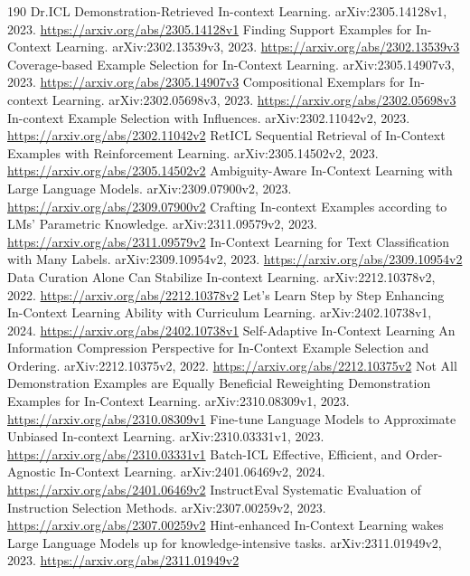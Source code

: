 \documentclass[11pt]{article}
\begin{document}
\begin{thebibliography}{190}
 Dr.ICL Demonstration-Retrieved In-context Learning. arXiv:2305.14128v1, 2023. \url{https://arxiv.org/abs/2305.14128v1}
 Finding Support Examples for In-Context Learning. arXiv:2302.13539v3, 2023. \url{https://arxiv.org/abs/2302.13539v3}
 Coverage-based Example Selection for In-Context Learning. arXiv:2305.14907v3, 2023. \url{https://arxiv.org/abs/2305.14907v3}
 Compositional Exemplars for In-context Learning. arXiv:2302.05698v3, 2023. \url{https://arxiv.org/abs/2302.05698v3}
 In-context Example Selection with Influences. arXiv:2302.11042v2, 2023. \url{https://arxiv.org/abs/2302.11042v2}
 RetICL Sequential Retrieval of In-Context Examples with Reinforcement Learning. arXiv:2305.14502v2, 2023. \url{https://arxiv.org/abs/2305.14502v2}
 Ambiguity-Aware In-Context Learning with Large Language Models. arXiv:2309.07900v2, 2023. \url{https://arxiv.org/abs/2309.07900v2}
 Crafting In-context Examples according to LMs' Parametric Knowledge. arXiv:2311.09579v2, 2023. \url{https://arxiv.org/abs/2311.09579v2}
 In-Context Learning for Text Classification with Many Labels. arXiv:2309.10954v2, 2023. \url{https://arxiv.org/abs/2309.10954v2}
 Data Curation Alone Can Stabilize In-context Learning. arXiv:2212.10378v2, 2022. \url{https://arxiv.org/abs/2212.10378v2}
 Let's Learn Step by Step Enhancing In-Context Learning Ability with Curriculum Learning. arXiv:2402.10738v1, 2024. \url{https://arxiv.org/abs/2402.10738v1}
 Self-Adaptive In-Context Learning An Information Compression Perspective for In-Context Example Selection and Ordering. arXiv:2212.10375v2, 2022. \url{https://arxiv.org/abs/2212.10375v2}
 Not All Demonstration Examples are Equally Beneficial Reweighting Demonstration Examples for In-Context Learning. arXiv:2310.08309v1, 2023. \url{https://arxiv.org/abs/2310.08309v1}
 Fine-tune Language Models to Approximate Unbiased In-context Learning. arXiv:2310.03331v1, 2023. \url{https://arxiv.org/abs/2310.03331v1}
 Batch-ICL Effective, Efficient, and Order-Agnostic In-Context Learning. arXiv:2401.06469v2, 2024. \url{https://arxiv.org/abs/2401.06469v2}
 InstructEval Systematic Evaluation of Instruction Selection Methods. arXiv:2307.00259v2, 2023. \url{https://arxiv.org/abs/2307.00259v2}
 Hint-enhanced In-Context Learning wakes Large Language Models up for knowledge-intensive tasks. arXiv:2311.01949v2, 2023. \url{https://arxiv.org/abs/2311.01949v2}

\end{thebibliography}
\end{document}
